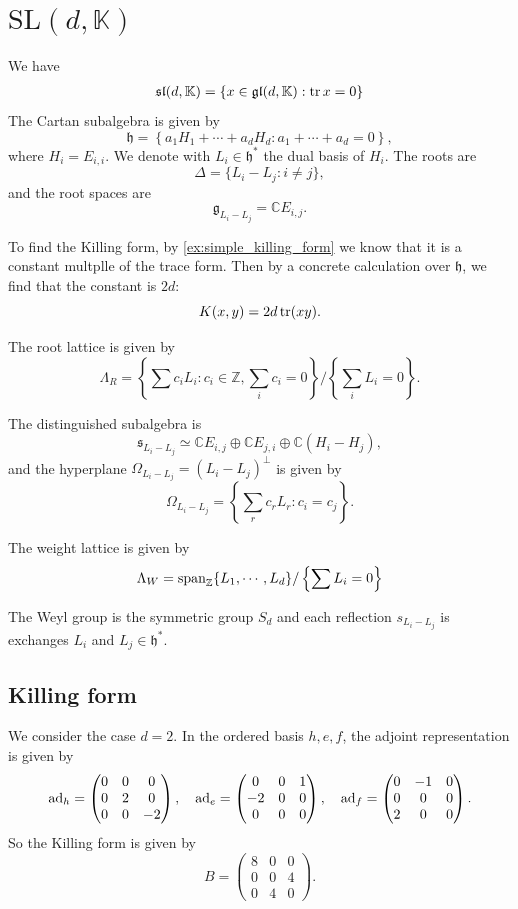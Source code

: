 \documentclass{report}
\begin{document}
\section{$\mathrm{SL}(d, \mathbb K)$}
We have
\begin{align*}
    \mathfrak{sl}(d, \mathbb K) &= \{ x \in \operatorname{{\mathfrak{gl}}}(d, \mathbb K) : \operatorname{tr} x = 0\}\\
\end{align*}
The Cartan subalgebra is given by
\[
\mathfrak h = \left\{ a_1 H_1 + \cdots + a_d H_d : a_1 + \cdots + a_d = 0 \right\},
\]
where $H_i = E_{i,i}$.
We denote with $L_i \in \mathfrak h^*$ the dual basis of $H_i$.
The roots are 
\[
    \Delta = \{ L_i - L_j : i \neq j \},
\] 
and the root spaces are $$\mathfrak g_{L_i - L_j} = \mathbb C E_{i,j}.$$

To find the Killing form, by \cref{ex:simple_killing_form} we know that it is a constant multplle of the trace form.
Then by a concrete calculation over $\mathfrak h$, we find that the constant is $2d$:
\[
K(x, y) = 2d \operatorname{tr}(xy).
\]

The root lattice is given by
\[
\Lambda_R = \left\{ \sum c_i L_i : c_i \in \mathbb Z, \sum_i c_i = 0 \right\}/\left\{ \sum_i L_i = 0 \right\}.
\]

The distinguished subalgebra is 
$$\mathfrak s_{L_i - L_j} \simeq \mathbb C E_{i,j} \oplus \mathbb C E_{j,i} \oplus \mathbb C (H_i - H_j),$$
and the hyperplane $\Omega_{L_i - L_j} = (L_i - L_j)^\perp$ is given by
\[
\Omega_{L_i - L_j} = \left\{ \sum_r c_r L_r : c_i = c_j \right\}.
\]

The weight lattice is given by 
\[
\Lambda_W = \operatorname{span}_{\mathbb Z} \{L_1, \cdots, L_d\} / \left\{ \sum L_i = 0  \right\}
\]

The Weyl group is the symmetric group $S_d$ and each reflection $s_{L_i - L_j}$ is exchanges $L_i$ and $L_j \in \mathfrak h^*$.
\subsection{Killing form}
We consider the case $d = 2$.
In the ordered basis $h,e,f$, the adjoint representation is given by
\[
\operatorname{ad}_h = \begin{pmatrix} 0 & 0 & 0 \\ 0 & 2 & 0 \\ 0 & 0 & -2 \end{pmatrix}, \quad
\operatorname{ad}_e = \begin{pmatrix} 0 & 0 & 1 \\ -2 & 0 & 0 \\ 0 & 0 & 0 \end{pmatrix}, \quad
\operatorname{ad}_f = \begin{pmatrix} 0 & -1 & 0 \\ 0 & 0 & 0 \\ 2 & 0 & 0 \end{pmatrix}.
\]
So the Killing form is given by
\[
B = \begin{pmatrix} 8 & 0 & 0 \\ 0 & 0 & 4 \\ 0 & 4 & 0 \end{pmatrix}.
\]
\end{document}
